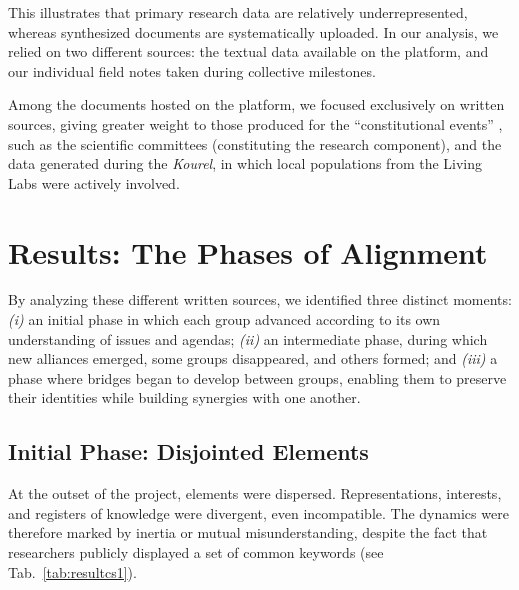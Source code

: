 \documentclass{article}
\begin{document}
This illustrates that primary research data are relatively underrepresented, whereas synthesized documents are systematically uploaded. In our analysis, we relied on two different sources: the textual data available on the platform, and our individual field notes taken during collective milestones.  

Among the documents hosted on the platform, we focused exclusively on written sources, giving greater weight to those produced for the “constitutional events” \parencite{jasanoff_constitutional_2011}, such as the scientific committees (constituting the research component), and the data generated during the \textit{Kourel}, in which local populations from the Living Labs were actively involved.  

\section{Results: The Phases of Alignment}

By analyzing these different written sources, we identified three distinct moments: \textit{(i)} an initial phase in which each group advanced according to its own understanding of issues and agendas; \textit{(ii)} an intermediate phase, during which new alliances emerged, some groups disappeared, and others formed; and \textit{(iii)} a phase where bridges began to develop between groups, enabling them to preserve their identities while building synergies with one another.  

\subsection{Initial Phase: Disjointed Elements}\label{sec:Phaseinit}

At the outset of the project, elements were dispersed. Representations, interests, and registers of knowledge were divergent, even incompatible. The dynamics were therefore marked by inertia or mutual misunderstanding, despite the fact that researchers publicly displayed a set of common keywords (see Tab.~\ref{tab:resultcs1}).  
\end{document}
